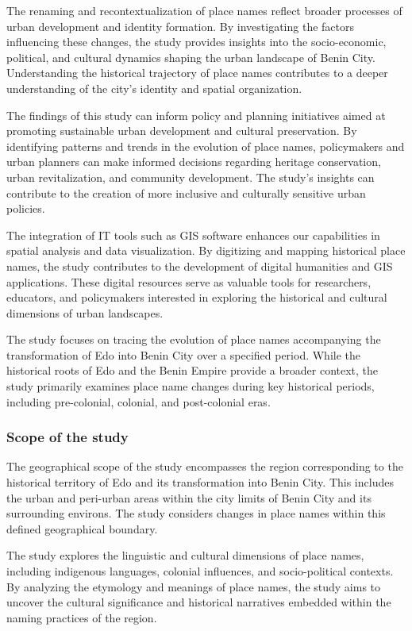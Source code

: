 The renaming and recontextualization of place names reflect broader processes of urban development and identity formation. By investigating the factors influencing these changes, the study provides insights into the socio-economic, political, and cultural dynamics shaping the urban landscape of Benin City. Understanding the historical trajectory of place names contributes to a deeper understanding of the city's identity and spatial organization.


The findings of this study can inform policy and planning initiatives aimed at promoting sustainable urban development and cultural preservation. By identifying patterns and trends in the evolution of place names, policymakers and urban planners can make informed decisions regarding heritage conservation, urban revitalization, and community development. The study's insights can contribute to the creation of more inclusive and culturally sensitive urban policies.


The integration of IT tools such as GIS software enhances our capabilities in spatial analysis and data visualization. By digitizing and mapping historical place names, the study contributes to the development of digital humanities and GIS applications. These digital resources serve as valuable tools for researchers, educators, and policymakers interested in exploring the historical and cultural dimensions of urban landscapes.


The study focuses on tracing the evolution of place names accompanying the transformation of Edo into Benin City over a specified period. While the historical roots of Edo and the Benin Empire provide a broader context, the study primarily examines place name changes during key historical periods, including pre-colonial, colonial, and post-colonial eras.
\subsubsection{Scope of the study}
The geographical scope of the study encompasses the region corresponding to the historical territory of Edo and its transformation into Benin City. This includes the urban and peri-urban areas within the city limits of Benin City and its surrounding environs. The study considers changes in place names within this defined geographical boundary.


The study explores the linguistic and cultural dimensions of place names, including indigenous languages, colonial influences, and socio-political contexts. By analyzing the etymology and meanings of place names, the study aims to uncover the cultural significance and historical narratives embedded within the naming practices of the region.


